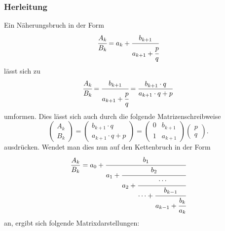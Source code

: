 \subsubsection{Herleitung}
Ein Näherungsbruch in der Form
\begin{align*}
	\cfrac{A_k}{B_k} = a_k + \cfrac{b_{k + 1}}{a_{k + 1} + \cfrac{p}{q}}
\end{align*}
lässt sich zu
\begin{align*}
	\cfrac{A_k}{B_k} = \cfrac{b_{k+1}}{a_{k+1} + \cfrac{p}{q}} = \frac{b_{k+1} \cdot q}{a_{k+1} \cdot q + p}
\end{align*}
umformen.
Dies lässt sich auch durch die folgende Matrizenschreibweise
\begin{equation*}
	\begin{pmatrix}
		A_k\\
		B_k
	\end{pmatrix}
	= 		\begin{pmatrix}
		b_{k+1} \cdot q\\
		a_{k+1} \cdot q + p
	\end{pmatrix}
	=\begin{pmatrix}
		0&	b_{k+1}\\
		1&	a_{k+1}
	\end{pmatrix}
	\begin{pmatrix}
		p \\
		q
	\end{pmatrix}.
\end{equation*}
ausdrücken.
Wendet man dies nun auf den Kettenbruch in der Form
\begin{equation*}
	\frac{A_k}{B_k} = a_0 + \cfrac{b_1}{a_1+\cfrac{b_2}{a_2+\cfrac{\cdots}{\cdots+\cfrac{b_{k-1}}{a_{k-1} + \cfrac{b_k}{a_k}}}}}
\end{equation*}
an, ergibt sich folgende Matrixdarstellungen:

